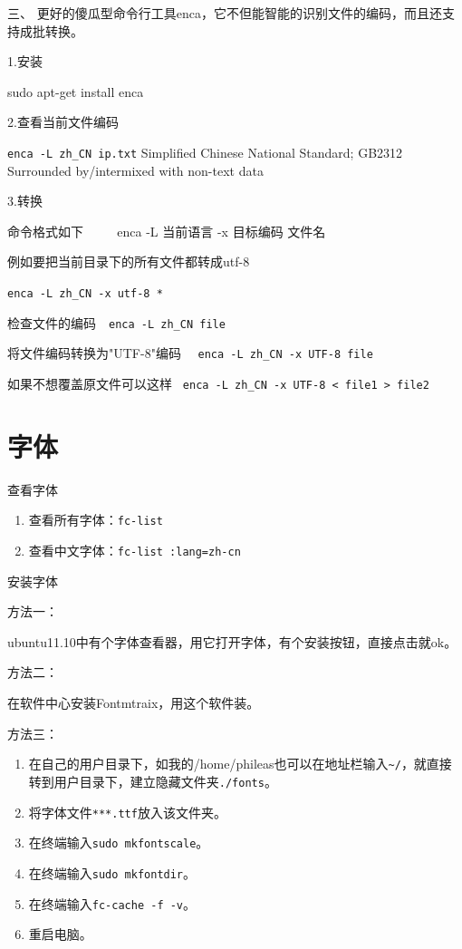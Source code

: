 {三、  更好的傻瓜型命令行工具enca，它不但能智能的识别文件的编码，而且还支持成批转换。  　　

1.安装  　　

sudo apt-get install enca  　　

2.查看当前文件编码  　　

\verb|enca -L zh_CN ip.txt|     Simplified Chinese National Standard; GB2312     Surrounded by/intermixed with non-text data  　　

3.转换  　　

命令格式如下  　　
enca -L 当前语言 -x 目标编码 文件名  　　

例如要把当前目录下的所有文件都转成utf-8  　　

\verb|enca -L zh_CN -x utf-8 * |

检查文件的编码　\verb|enca -L zh_CN file|   　　

 将文件编码转换为"UTF-8"编码　 \verb|enca -L zh_CN -x UTF-8 file|

如果不想覆盖原文件可以这样        \verb| enca -L zh_CN -x UTF-8 < file1 > file2 |



\section{字体}
查看字体
\begin{enumerate}
\item 查看所有字体：\verb*|fc-list|
\item 查看中文字体：\verb*|fc-list :lang=zh-cn|
\end{enumerate}

安装字体

方法一：

ubuntu11.10中有个字体查看器，用它打开字体，有个安装按钮，直接点击就ok。

方法二：

在软件中心安装Fontmtraix，用这个软件装。

方法三：
\begin{enumerate}
\item 在自己的用户目录下，如我的/home/phileas也可以在地址栏输入\verb|~/|，就直接转到用户目录下，建立隐藏文件夹\verb|./fonts|。
\item 将字体文件\verb|***.ttf|放入该文件夹。
\item 在终端输入\verb|sudo mkfontscale|。
\item 在终端输入\verb|sudo mkfontdir|。
\item 在终端输入\verb|fc-cache -f -v|。
\item 重启电脑。
\end{enumerate}



}
